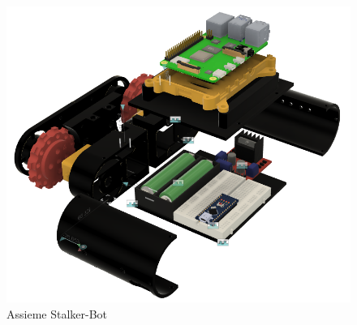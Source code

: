 \documentclass[12pt]{report}
\begin{document}
\FloatBarrier
\begin{figure}[!ht]
\begin{adjustwidth}{-2cm}{}
    \centering
    \includegraphics[width=18cm]{images/assieme_stalker_bot.png}
    \caption{Assieme Stalker-Bot}
\end{adjustwidth}
\end{figure}
\FloatBarrier
\end{document}
